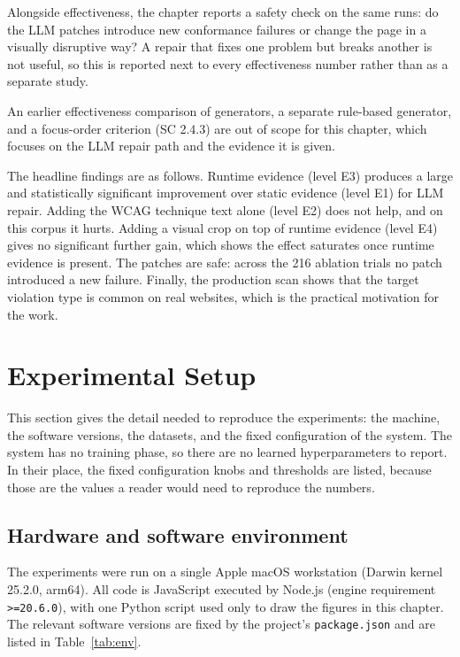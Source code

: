 \documentclass[11pt]{article}
\begin{document}
Alongside effectiveness, the chapter reports a safety check on the same runs: do the
LLM patches introduce new conformance failures or change the page in a visually
disruptive way? A repair that fixes one problem but breaks another is not useful, so
this is reported next to every effectiveness number rather than as a separate study.

An earlier effectiveness comparison of generators, a separate rule-based generator,
and a focus-order criterion (SC 2.4.3) are out of scope for this chapter, which
focuses on the LLM repair path and the evidence it is given.

The headline findings are as follows. Runtime evidence (level E3) produces a large
and statistically significant improvement over static evidence (level E1) for LLM
repair. Adding the WCAG technique text alone (level E2) does not help, and on this
corpus it hurts. Adding a visual crop on top of runtime evidence (level E4) gives no
significant further gain, which shows the effect saturates once runtime evidence is
present. The patches are safe: across the 216 ablation trials no patch introduced a
new failure. Finally, the production scan shows that the target violation type is
common on real websites, which is the practical motivation for the work.

\section{Experimental Setup}

This section gives the detail needed to reproduce the experiments: the machine, the
software versions, the datasets, and the fixed configuration of the system. The
system has no training phase, so there are no learned hyperparameters to report. In
their place, the fixed configuration knobs and thresholds are listed, because those
are the values a reader would need to reproduce the numbers.

\subsection{Hardware and software environment}

The experiments were run on a single Apple macOS workstation (Darwin kernel
25.2.0, arm64). All code is JavaScript executed by Node.js (engine requirement
\verb|>=20.6.0|), with one Python script used only to draw the figures in this
chapter. The relevant software versions are fixed by the project's
\texttt{package.json} and are listed in Table~\ref{tab:env}.
\end{document}
